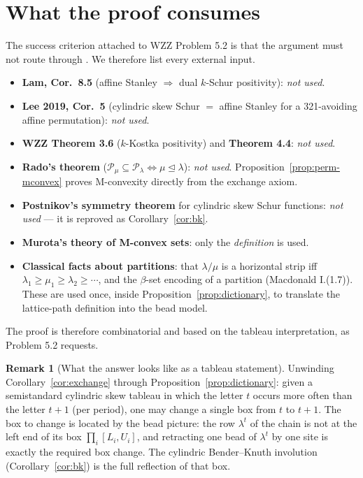 \documentclass[11pt]{article}
\theoremstyle{plain}
\theoremstyle{definition}
\newtheorem{rem}[thm]{Remark}
\begin{document}
\section{What the proof consumes}\label{sec:consumes}

The success criterion attached to WZZ Problem 5.2 is that the argument must not route through
\cite[Cor.~8.5]{Lam2008}. We therefore list every external input.

\begin{itemize}
\item \textbf{Lam, Cor.\ 8.5} (affine Stanley $\Rightarrow$ dual $k$-Schur positivity):
\emph{not used}.
\item \textbf{Lee 2019, Cor.\ 5} (cylindric skew Schur $=$ affine Stanley for a 321-avoiding
affine permutation): \emph{not used}.
\item \textbf{WZZ Theorem 3.6} ($k$-Kostka positivity) and \textbf{Theorem 4.4}:
\emph{not used}.
\item \textbf{Rado's theorem} ($\mathcal{P}_\mu\subseteq\mathcal{P}_\lambda\iff
\mu\trianglelefteq\lambda$): \emph{not used}. Proposition~\ref{prop:perm-mconvex} proves
M-convexity directly from the exchange axiom.
\item \textbf{Postnikov's symmetry theorem} \cite{Post} for cylindric skew Schur functions:
\emph{not used} --- it is reproved as Corollary~\ref{cor:bk}.
\item \textbf{Murota's theory of M-convex sets}: only the \emph{definition} is used.
\item \textbf{Classical facts about partitions}: that $\lambda/\mu$ is a horizontal strip iff
$\lambda_1\ge\mu_1\ge\lambda_2\ge\cdots$, and the $\beta$-set encoding of a partition
(Macdonald I.(1.7)). These are used once, inside Proposition~\ref{prop:dictionary}, to
translate the lattice-path definition into the bead model.
\end{itemize}

The proof is therefore combinatorial and based on the tableau interpretation, as Problem 5.2
requests.

\begin{rem}[What the answer looks like as a tableau statement]
Unwinding Corollary~\ref{cor:exchange} through Proposition~\ref{prop:dictionary}: given a
semistandard cylindric skew tableau in which the letter $t$ occurs more often than the letter
$t+1$ (per period), one may change a single box from $t$ to $t+1$. The box to change is
located by the bead picture: the row $\lambda^{t}$ of the chain is not at the left end of its
box $\prod_i[L_i,U_i]$, and retracting one bead of $\lambda^{t}$ by one site is exactly the
required box change. The cylindric Bender--Knuth involution (Corollary~\ref{cor:bk}) is the
full reflection of that box.
\end{rem}
\end{document}
